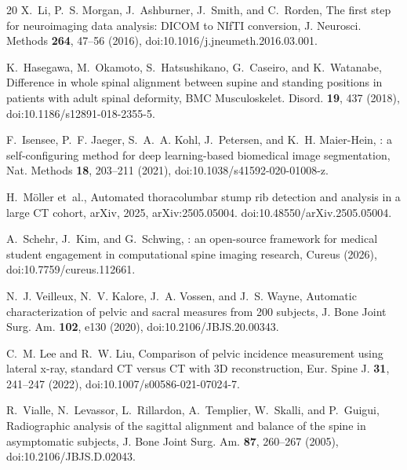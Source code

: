 \documentclass[aapm,mph,amsmath,amssymb,reprint]{revtex4-2}
\newif\ifreview \reviewfalse
\begin{document}
\begin{thebibliography}{20}
X.~Li, P.~S. Morgan, J.~Ashburner, J.~Smith, and C.~Rorden,
\newblock The first step for neuroimaging data analysis: {DICOM} to {NIfTI} conversion,
\newblock J. Neurosci. Methods {\bf 264}, 47--56 (2016),
\newblock doi:10.1016/j.jneumeth.2016.03.001.

K.~Hasegawa, M.~Okamoto, S.~Hatsushikano, G.~Caseiro, and K.~Watanabe,
\newblock Difference in whole spinal alignment between supine and standing positions in patients with adult spinal deformity,
\newblock BMC Musculoskelet. Disord. {\bf 19}, 437 (2018),
\newblock doi:10.1186/s12891-018-2355-5.

F.~Isensee, P.~F. Jaeger, S.~A.~A. Kohl, J.~Petersen, and K.~H. Maier-Hein,
: a self-configuring method for deep learning-based biomedical image segmentation,
\newblock Nat. Methods {\bf 18}, 203--211 (2021),
\newblock doi:10.1038/s41592-020-01008-z.

H.~M{\"o}ller et~al.,
\newblock Automated thoracolumbar stump rib detection and analysis in a large {CT} cohort,
\newblock arXiv, 2025,
\newblock arXiv:2505.05004. doi:10.48550/arXiv.2505.05004.

\ifreview
[Reference removed for double-anonymized review.]
\else
A.~Schehr, J.~Kim, and G.~Schwing,
: an open-source framework for medical student engagement in computational spine imaging research,
\newblock Cureus  (2026),
\newblock doi:10.7759/cureus.112661.
\fi

N.~J. Veilleux, N.~V. Kalore, J.~A. Vossen, and J.~S. Wayne,
\newblock Automatic characterization of pelvic and sacral measures from 200 subjects,
\newblock J. Bone Joint Surg. Am. {\bf 102}, e130 (2020),
\newblock doi:10.2106/JBJS.20.00343.

C.~M. Lee and R.~W. Liu,
\newblock Comparison of pelvic incidence measurement using lateral x-ray, standard {CT} versus {CT} with {3D} reconstruction,
\newblock Eur. Spine J. {\bf 31}, 241--247 (2022),
\newblock doi:10.1007/s00586-021-07024-7.

R.~Vialle, N.~Levassor, L.~Rillardon, A.~Templier, W.~Skalli, and P.~Guigui,
\newblock Radiographic analysis of the sagittal alignment and balance of the spine in asymptomatic subjects,
\newblock J. Bone Joint Surg. Am. {\bf 87}, 260--267 (2005),
\newblock doi:10.2106/JBJS.D.02043.


\end{thebibliography}
\end{document}
